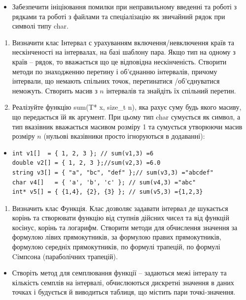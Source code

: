 \documentclass[]{article}
\begin{document}
\begin{itemize}
\item
  Забезпечити ініціювання помилки при неправильному введенні та роботі з
  рядками та роботі з файлами та спеціалізацію як звичайний рядок при
  символі типу char.
\end{itemize}

\begin{enumerate}
\def\labelenumi{\arabic{enumi}.}
\item
  Визначити клас Інтервал с урахуванням включення/невключення країв та
  нескінченості на інтервалах, на базі шаблону пара. Якщо тип на одному
  з країв -- рядок, то вважається що це відповідна нескінченість.
  Створити методи по знаходженню перетину і об'єднанню інтервалів,
  причому інтервали, що немають спільних точок, перетинатися
  /об'єднуватися неможуть. Створить масив з \(n\) інтервалів та знайдіть
  їх спільний перетин.
\item
  Реалізуйте функцію sum(T* x, size\_t n), яка рахує суму будь якого
  масиву, що передається їй як аргумент. При цьому тип char сумується як
  символ, а тип вказівник вважається масивом розміру 1 та сумується
  утворюючи масив розміру \(n\) (нульові вказівники просто ігноруються в
  додаванні):
\end{enumerate}

\begin{itemize}
\item
\begin{verbatim}
int v1[]  = { 1, 2, 3 }; // sum(v1,3) =6 
double v2[] = { 1, 2, 3 };//sum(v2,3) =6.0 
string v3[] = { "a", "bc", "def" };// sum(v3,3) ="abcdef"
char v4[]   = { 'a', 'b', 'c' }; // sum(v4,3) ="abc"
int* v5[] = { {1,4}, {2}, {3} }; // sum(v5,3) ={1,2,3}
\end{verbatim}
\end{itemize}

\begin{enumerate}
\def\labelenumi{\arabic{enumi}.}
\item
  Визначить клас Функція. Клас дозволяє задавати інтервал де шукається
  корінь та створювати функцію від ступнів дійсних чисел та від функцій
  косінус, корінь та логарифм. Створити методи для обчислення значення
  за формулою лівих прямокутників, за формулою правих прямокутників,
  формулою середніх прямокутників, по формулі трапецій, по формулі
  Cімпсона (параболічних трапецій).
\end{enumerate}

\begin{itemize}
\item
  Створіть метод для семплювання функції -- задаються межі інтералу та
  кількість семплів на інтервалі, обчислюються дискретні значення в
  даних точках і будується й виводиться таблиця, що містить пари
  точкі-значення.
\end{itemize}
\end{document}

